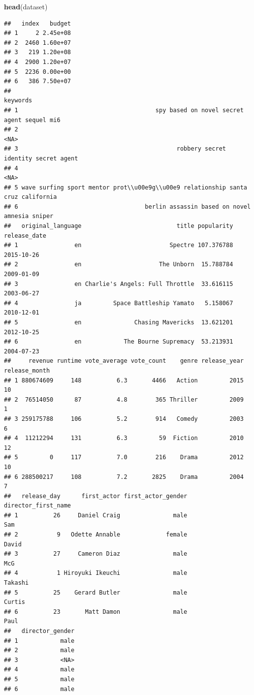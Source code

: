 \documentclass[
]{article}
\newenvironment{Shaded}{\begin{snugshade}}{\end{snugshade}}
\newcommand{\FunctionTok}[1]{\textcolor[rgb]{0.13,0.29,0.53}{\textbf{#1}}}
\newcommand{\NormalTok}[1]{#1}
\begin{document}
\begin{Shaded}
\begin{Highlighting}[]
\FunctionTok{head}\NormalTok{(dataset)}
\end{Highlighting}
\end{Shaded}

\begin{verbatim}
##   index   budget
## 1     2 2.45e+08
## 2  2460 1.60e+07
## 3   219 1.20e+08
## 4  2900 1.20e+07
## 5  2236 0.00e+00
## 6   386 7.50e+07
##                                                                           keywords
## 1                                       spy based on novel secret agent sequel mi6
## 2                                                                             <NA>
## 3                                             robbery secret identity secret agent
## 4                                                                             <NA>
## 5 wave surfing sport mentor prot\\u00e9g\\u00e9 relationship santa cruz california
## 6                                    berlin assassin based on novel amnesia sniper
##   original_language                           title popularity release_date
## 1                en                         Spectre 107.376788   2015-10-26
## 2                en                      The Unborn  15.788784   2009-01-09
## 3                en Charlie's Angels: Full Throttle  33.616115   2003-06-27
## 4                ja         Space Battleship Yamato   5.158067   2010-12-01
## 5                en               Chasing Mavericks  13.621201   2012-10-25
## 6                en            The Bourne Supremacy  53.213931   2004-07-23
##     revenue runtime vote_average vote_count    genre release_year release_month
## 1 880674609     148          6.3       4466   Action         2015            10
## 2  76514050      87          4.8        365 Thriller         2009             1
## 3 259175788     106          5.2        914   Comedy         2003             6
## 4  11212294     131          6.3         59  Fiction         2010            12
## 5         0     117          7.0        216    Drama         2012            10
## 6 288500217     108          7.2       2825    Drama         2004             7
##   release_day      first_actor first_actor_gender director_first_name
## 1          26     Daniel Craig               male                 Sam
## 2           9   Odette Annable             female               David
## 3          27     Cameron Diaz               male                 McG
## 4           1 Hiroyuki Ikeuchi               male             Takashi
## 5          25    Gerard Butler               male              Curtis
## 6          23       Matt Damon               male                Paul
##   director_gender
## 1            male
## 2            male
## 3            <NA>
## 4            male
## 5            male
## 6            male
\end{verbatim}
\end{document}
